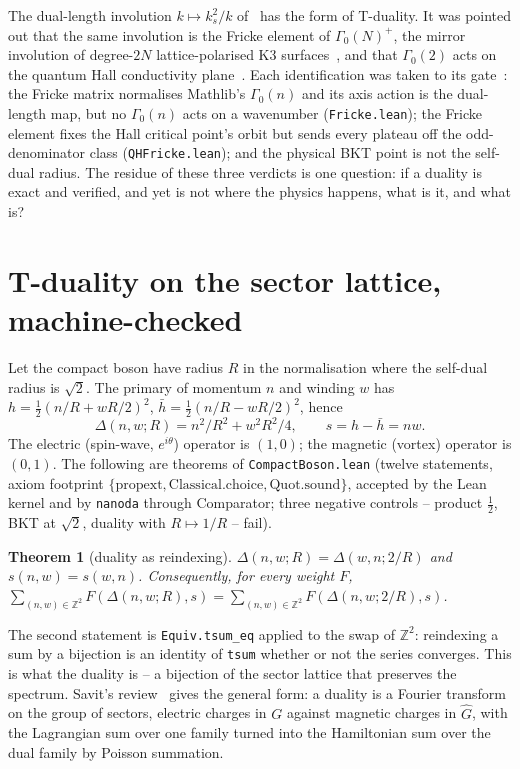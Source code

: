 \documentclass[11pt,a4paper]{article}
\newcommand{\lean}[1]{\texttt{\small #1}}
\newtheorem{theorem}{Theorem}
\begin{document}
The dual-length involution $k\mapsto k_s^2/k$ of~\cite{Callens2026Lean} has the form of T-duality. It was pointed
out that the same involution is the Fricke element of $\Gamma_0(N)^+$, the mirror involution of degree-$2N$
lattice-polarised K3 surfaces~\cite{Dolgachev1996}, and that $\Gamma_0(2)$ acts on the quantum Hall conductivity
plane~\cite{LutkenRoss1992}. Each identification was taken to its gate~\cite{Callens2026Wasserstein,
Callens2026Causal}: the Fricke matrix normalises Mathlib's $\Gamma_0(n)$ and its axis action is the dual-length map,
but no $\Gamma_0(n)$ acts on a wavenumber (\lean{Fricke.lean}); the Fricke element fixes the Hall critical point's
orbit but sends every plateau off the odd-denominator class (\lean{QHFricke.lean}); and the physical BKT point is not
the self-dual radius. The residue of these three verdicts is one question: if a duality is exact and verified, and
yet is not where the physics happens, what is it, and what is?

\section{T-duality on the sector lattice, machine-checked}

Let the compact boson have radius $R$ in the normalisation where the self-dual radius is $\sqrt2$. The primary of
momentum $n$ and winding $w$ has $h=\tfrac12(n/R+wR/2)^2$, $\bar h=\tfrac12(n/R-wR/2)^2$, hence
\[
\Delta(n,w;R)=n^2/R^2+w^2R^2/4,\qquad s=h-\bar h=nw .
\]
The electric (spin-wave, $e^{i\theta}$) operator is $(1,0)$; the magnetic (vortex) operator is $(0,1)$. The
following are theorems of \lean{CompactBoson.lean} (twelve statements, axiom footprint $\{\mathrm{propext},
\mathrm{Classical.choice},\mathrm{Quot.sound}\}$, accepted by the Lean kernel and by \lean{nanoda} through
Comparator; three negative controls -- product $\tfrac12$, BKT at $\sqrt2$, duality with $R\mapsto1/R$ -- fail).

\begin{theorem}[duality as reindexing]
$\Delta(n,w;R)=\Delta(w,n;2/R)$ and $s(n,w)=s(w,n)$. Consequently, for every weight $F$,
$\sum_{(n,w)\in\mathbb Z^2}F(\Delta(n,w;R),s)=\sum_{(n,w)\in\mathbb Z^2}F(\Delta(n,w;2/R),s)$.
\end{theorem}
The second statement is \lean{Equiv.tsum\_eq} applied to the swap of $\mathbb Z^2$: reindexing a sum by a
bijection is an identity of \lean{tsum} whether or not the series converges. This is what the duality is -- a
bijection of the sector lattice that preserves the spectrum. Savit's review~\cite{Savit1980} gives the general
form: a duality is a Fourier transform on the group of sectors, electric charges in $G$ against magnetic charges
in $\hat G$, with the Lagrangian sum over one family turned into the Hamiltonian sum over the dual family by Poisson
summation.
\end{document}
